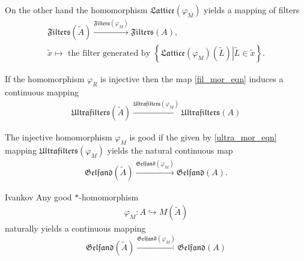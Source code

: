 \documentclass{beamer}
\theoremstyle{plain}
\newcommand{\be}{\begin{equation}}
\newcommand{\ee}{\end{equation}}
\newcommand{\bean}{\begin{eqnarray*}}
\newcommand{\eean}{\end{eqnarray*}}
\newcommand{\hookto}{\hookrightarrow}        %
\begin{document}
\begin{frame}
On the other hand the homomorphism $\mathfrak{Lattice}\left(\varphi_M \right)$ yields a mapping of filters
\be\label{fil_mor_eqn}
\begin{split}
	\mathfrak{Filters}\left(\widetilde  A\right) \xrightarrow{\mathfrak{Filters}\left(\varphi_M \right)}\mathfrak{Filters} \left( A\right),\\
	\widetilde{x} \mapsto \text{ the filter generated by }\left\{\mathfrak{Lattice}\left(\varphi_M \right)\left(\widetilde L \right)  \left| \widetilde{L}\in \widetilde{ x} \right.\right\}.
\end{split}
\ee
\begin{lemma}\label{good_lem}
	If the homomorphism $\varphi_R$ is injective then the map \eqref{fil_mor_eqn}  induces a continuous mapping
	\be\label{ultra_mor_eqn}
	\begin{split}
		\mathfrak{Ultrafilters}\left(\widetilde  A\right) \xrightarrow{\mathfrak{Ultrafilters}\left(\varphi_M \right)}\mathfrak{Ultrafilters} \left( A\right)
	\end{split}
	\ee
\end{lemma}
\begin{definition}\label{good_defn}
	The injective homomorphism $\varphi_M$ is \alert{good} if the given by \eqref{ultra_mor_eqn} mapping $\mathfrak{Ultrafilters}\left(\varphi_M \right)$ yields the natural continuous  map
	\bean
	\mathfrak{Gelfand}\left(\widetilde A \right)\xrightarrow{\mathfrak{Gelfand}\left(\varphi_M \right)}\mathfrak{Gelfand}\left(A \right).
	\eean
\end{definition}
\end{frame}
\begin{frame}

\begin{lemma}\alert{Ivankov}
	Any good $*$-homomorphism 	
	\bean
	\varphi_M: A \hookto M\left(\widetilde A\right)	\eean
naturally yields a continuous mapping 
	\be\label{gelfand_map_eqn}
	\mathfrak{Gelfand}\left(\widetilde A \right)\xrightarrow{\mathfrak{Gelfand}\left(\varphi_M \right)}\mathfrak{Gelfand}\left(A \right)
	\ee
	\end{lemma}
\end{frame}
\end{document}
